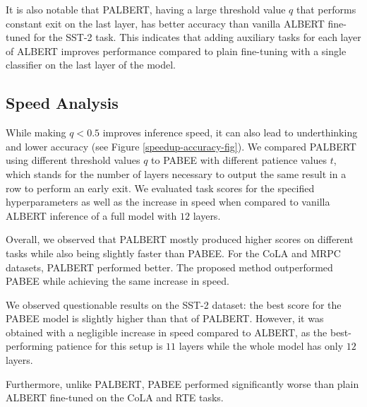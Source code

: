 \documentclass{article}
\begin{document}
It is also notable that PALBERT, having a large threshold value $q$ that performs constant exit on the last layer, has better accuracy than vanilla ALBERT fine-tuned for the SST-2 task. This indicates that adding auxiliary tasks for each layer of ALBERT improves performance compared to plain fine-tuning with a single classifier on the last layer of the model.



\subsection{Speed Analysis}
\label{speedup-section}
While making $q<0.5$ improves inference speed, it can also lead to underthinking and lower accuracy (see Figure \ref{speedup-accuracy-fig}). We compared PALBERT using different threshold values $q$ to PABEE with different patience values $t$, which stands for the number of layers necessary to output the same result in a row to perform an early exit. We evaluated task scores for the specified hyperparameters as well as the increase in speed when compared to vanilla ALBERT inference of a full model with $12$ layers.

Overall, we observed that PALBERT mostly produced higher scores on different tasks while also being slightly faster than PABEE. For the CoLA and MRPC datasets, PALBERT performed better. The proposed method outperformed PABEE while achieving the same increase in speed.

We observed questionable results on the SST-2 dataset: the best score for the PABEE model is slightly higher than that of PALBERT. However, it was obtained with a negligible increase in speed compared to ALBERT, as the best-performing patience for this setup is $11$ layers while the whole model has only $12$ layers.

Furthermore, unlike PALBERT, PABEE performed significantly worse than plain ALBERT fine-tuned on the CoLA and RTE tasks.
\end{document}
